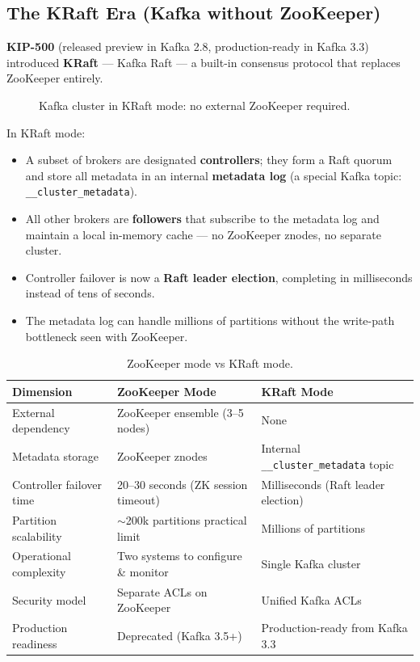 \subsection{The KRaft Era (Kafka without ZooKeeper)}

\textbf{KIP-500} (released preview in Kafka 2.8, production-ready in Kafka 3.3)
introduced \textbf{KRaft} — Kafka Raft — a built-in consensus protocol that
replaces ZooKeeper entirely.

\begin{figure}[H]
  \centering
  \caption{Kafka cluster in KRaft mode: no external ZooKeeper required.}
  \label{fig:kafka-kraft}
\end{figure}

In KRaft mode:
\begin{itemize}
  \item A subset of brokers are designated \textbf{controllers}; they form a Raft quorum and store all metadata in an internal \textbf{metadata log} (a special Kafka topic: \texttt{\_\_cluster\_metadata}).
  \item All other brokers are \textbf{followers} that subscribe to the metadata log and maintain a local in-memory cache — no ZooKeeper znodes, no separate cluster.
  \item Controller failover is now a \textbf{Raft leader election}, completing in milliseconds instead of tens of seconds.
  \item The metadata log can handle millions of partitions without the write-path bottleneck seen with ZooKeeper.
\end{itemize}

\begin{table}[H]
  \centering
  \caption{ZooKeeper mode vs KRaft mode.}
  \label{tab:zk-vs-kraft}
  \begin{tabularx}{\textwidth}{lXX}
    \toprule
    \textbf{Dimension}        & \textbf{ZooKeeper Mode}               & \textbf{KRaft Mode} \\
    \midrule
    External dependency       & ZooKeeper ensemble (3–5 nodes)        & None \\
    Metadata storage          & ZooKeeper znodes                      & Internal \texttt{\_\_cluster\_metadata} topic \\
    Controller failover time  & 20–30 seconds (ZK session timeout)    & Milliseconds (Raft leader election) \\
    Partition scalability     & $\sim$200k partitions practical limit & Millions of partitions \\
    Operational complexity    & Two systems to configure \& monitor   & Single Kafka cluster \\
    Security model            & Separate ACLs on ZooKeeper            & Unified Kafka ACLs \\
    Production readiness      & Deprecated (Kafka 3.5+)               & Production-ready from Kafka 3.3 \\
    \bottomrule
  \end{tabularx}
\end{table}
